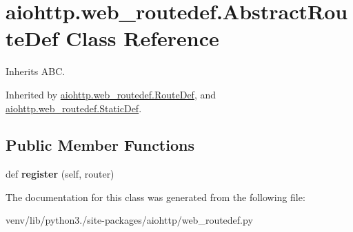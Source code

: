 \hypertarget{classaiohttp_1_1web__routedef_1_1_abstract_route_def}{}\section{aiohttp.\+web\+\_\+routedef.\+Abstract\+Route\+Def Class Reference}
\label{classaiohttp_1_1web__routedef_1_1_abstract_route_def}


Inherits A\+BC.



Inherited by \hyperlink{classaiohttp_1_1web__routedef_1_1_route_def}{aiohttp.\+web\+\_\+routedef.\+Route\+Def}, and \hyperlink{classaiohttp_1_1web__routedef_1_1_static_def}{aiohttp.\+web\+\_\+routedef.\+Static\+Def}.

\subsection*{Public Member Functions}
\begin{DoxyCompactItemize}
\item 
\mbox{\label{classaiohttp_1_1web__routedef_1_1_abstract_route_def_a39da6ebe6311802d54bc4d80f2699f4d}} 
def {\bfseries register} (self, router)
\end{DoxyCompactItemize}


The documentation for this class was generated from the following file\+:\begin{DoxyCompactItemize}
\item 
venv/lib/python3./site-\/packages/aiohttp/web\+\_\+routedef.\+py\end{DoxyCompactItemize}
